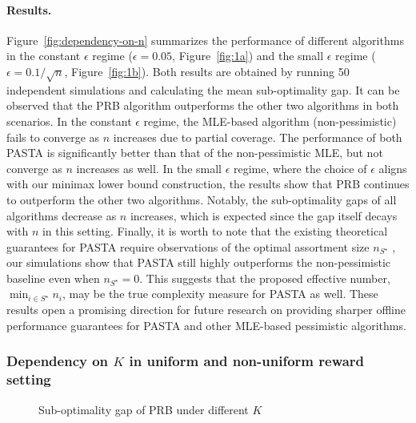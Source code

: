 \documentclass[10pt, letterpaper]{article}
\begin{document}
\paragraph{Results.} Figure~\ref{fig:dependency-on-n} summarizes the performance of different algorithms in the constant $\epsilon$ regime ($\epsilon = 0.05$, Figure~\ref{fig:1a}) and the small $\epsilon$ regime ($\epsilon = 0.1/\sqrt{n}$, Figure~\ref{fig:1b}). Both results are obtained by running 50 independent simulations and calculating the mean sub-optimality gap. It can be observed that the PRB algorithm outperforms the other two algorithms in both scenarios. In the constant $\epsilon$ regime, the MLE-based algorithm (non-pessimistic) fails to converge as $n$ increases due to partial coverage. The performance of both PASTA is significantly better than that of the non-pessimistic MLE, but not converge as $n$ increases as well.
In the small $\epsilon$ regime, where the choice of $\epsilon$ aligns with our minimax lower bound construction, the results show that PRB continues to outperform the other two algorithms. Notably, the sub-optimality gaps of all algorithms decrease as $n$ increases, which is expected since the gap itself decays with $n$ in this setting.
Finally, it is worth to note that the existing theoretical guarantees for PASTA require observations of the optimal assortment size $n_{S^\star}$ \citep{dong2023pasta}, our simulations show that PASTA still highly outperforms the non-pessimistic baseline even when $n_{S^\star} = 0$. This suggests that the proposed effective number, $\min_{i \in S^\star} n_i$, may be the true complexity measure for PASTA as well. These results open a promising direction for future research on providing sharper offline performance guarantees for PASTA and other MLE-based pessimistic algorithms.



\subsubsection{Dependency on $K$ in uniform and non-uniform reward setting}



\begin{figure}[htbp]
    \centering
    \hfill  %
    \caption{Sub-optimality gap of PRB under different $K$}
    \label{fig:dependency-on-K}
\end{figure}
\end{document}
